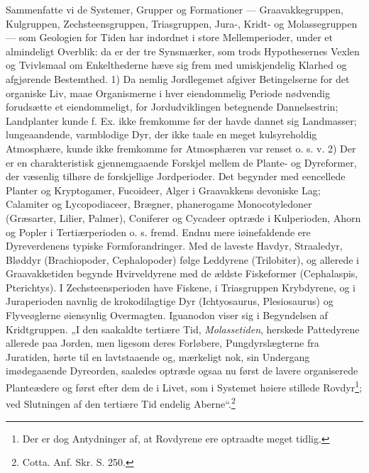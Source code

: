 \documentclass[12pt,a4paper]{book}
\renewcommand{\thefootnote}{*)}
\begin{document}
Sammenfatte vi de Systemer, Grupper og Formationer --- Graavakkegruppen,
Kulgruppen, Zechsteensgruppen, Triasgruppen, Jura-, Kridt- og
Molassegruppen --- som Geologien for Tiden har indordnet i store
Mellemperioder, under et almindeligt Overblik: da er der tre Synsmærker, som
trods Hypothesernes Vexlen og Tvivlsmaal om Enkelthederne hæve sig frem med
umiskjendelig Klarhed og afgjørende Bestemthed. 1) Da nemlig Jordlegemet
afgiver Betingelserne for det organiske Liv, maae Organismerne i hver
eiendommelig Periode nødvendig forudsætte et eiendommeligt, for
Jordudviklingen betegnende Dannelsestrin; Landplanter kunde f. Ex. ikke
fremkomme før der havde dannet sig Landmasser; lungeaandende, varmblodige
Dyr, der ikke taale en meget kulsyreholdig Atmosphære, kunde ikke fremkomme
før Atmosphæren var renset o. s. v. 2) Der er en charakteristisk
gjennemgaaende Forskjel mellem de Plante- og Dyreformer, der
væsenlig tilhøre de forskjellige Jordperioder. Det begynder med eencellede
Planter og Kryptogamer, Fucoideer, Alger i Graavakkens devoniske Lag;
Calamiter og Lycopodiaceer, Brægner, phanerogame Monocotyledoner (Græsarter,
Lilier, Palmer), Coniferer og Cycadeer optræde i Kulperioden, Ahorn og Popler
i Tertiærperioden o. s. fremd. Endnu mere iøinefaldende ere Dyreverdenens
typiske Formforandringer. Med de laveste Havdyr, Straaledyr, Bløddyr
(Brachiopoder, Cephalopoder) følge Leddyrene (Trilobiter), og allerede i
Graavakketiden begynde Hvirveldyrene med de ældste Fiskeformer (Cephalaspis,
Pterichtys). I Zechsteensperioden have Fiskene, i Triasgruppen Krybdyrene, og
i Juraperioden navnlig de krokodilagtige Dyr (Ichtyosaurus, Plesiosaurus) og
Flyveøglerne øiensynlig Overmagten. Iguanodon viser sig i Begyndelsen af
Kridtgruppen. „I den saakaldte tertiære Tid, \emph{Molassetiden}, herskede
Pattedyrene allerede paa Jorden, men ligesom deres Forløbere,
Pungdyrslægterne fra Juratiden, hørte til en lavtstaaende og, mærkeligt nok,
sin Undergang imødegaaende Dyreorden, saaledes optræde ogsaa nu først de
lavere organiserede Planteædere og først efter dem de i Livet, som i Systemet
høiere stillede
Rovdyr\footnote{%
Der er dog Antydninger af, at Rovdyrene ere optraadte meget tidlig.}; ved
Slutningen af den tertiære Tid endelig
\renewcommand{\thefootnote}{**)}%
Aberne“.\footnote{%
Cotta. Anf. Skr. S. 250.}%
\end{document}
